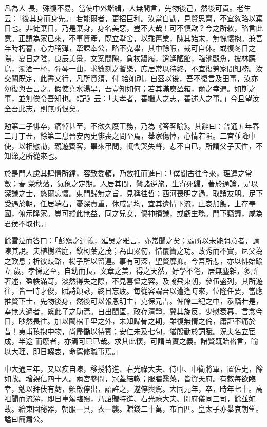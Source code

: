 \begin{pinyinscope}
 凡為人
 長，殊復不易，當使中外諧緝，人無間言，先物後己，然後可貴。老生云：「後其身而身先。」若能爾者，更招巨利。汝當自勖，見賢思齊，不宜忽略以棄日也。非徒棄日，乃是棄身，身名美惡，豈不大哉！可不慎歟？今之所敕，略言此意。正謂為家已來，不事資產，既立墅舍，以乖舊業，陳其始末，無愧懷抱。兼吾年時朽暮，心力稍殫，牽課奉公，略不克舉，其中餘暇，裁可自休。或復冬日之陽，夏日之陰，良辰美景，文案間隙，負杖躡履，逍遙陋館，臨池觀魚，披林聽鳥，濁酒一杯，彈琴一曲，求數刻之暫樂，庶居常以待終，不宜復勞家間細務。汝交關既定，此書又行，凡所資須，付
 給如別。自茲以後，吾不復言及田事，汝亦勿復與吾言之。假使堯水湯旱，吾豈知如何；若其滿庾盈箱，爾之幸遇。如斯之事，並無俟令吾知也。《記》云：「夫孝者，善繼人之志，善述人之事。」今且望汝全吾此志，則無所恨矣。



 勉第二子悱卒，痛悼甚至，不欲久廢王務，乃為《答客喻》。其辭曰：普通五年春二月丁丑，餘第二息晉安內史悱喪之問至焉，舉家傷悼，心情若隕。二宮並降中使，以相慰勖，親遊賓客，畢來弔問，輒慟哭失聲，悲不自已，所謂父子天性，不知涕之所從來也。



 於是門人慮其肆情所鐘，容致委頓，乃斂衽而進曰：「僕聞古往今來，理運之常數；春
 榮秋落，氣象之定期。人居其間，譬諸逆旅，生寄死歸，著於通論，是以深識之士，悠爾忘懷。東門歸無之旨，見稱往哲；西河喪明之過，取誚友朋。足下受遇於朝，任居端右，憂深責重，休戚是均，宜其遺情下流，止哀加飯，上存奉國，俯示隆家。豈可縱此無益，同之兒女，傷神損識，或虧生務。門下竊議，咸為君侯不取也。」



 餘雪泣而答曰：「彭殤之達義，延吳之雅言，亦常聞之矣；顧所以未能弭意者，請陳其說。夫植樹階庭，欽柯葉之茂；為山累仞，惜覆簣之功。故秀而不實，尼父為之歎息；析彼歧路，楊子所以留連。事有可深，聖賢靡抑。今吾所悲，亦以悱始踰立
 歲，孝悌之至，自幼而長，文章之美，得之天然，好學不倦，居無塵雜，多所著述，盈帙滿笥，淡然得失之際，不見喜慍之容。及翰飛東朝，參伍盛列，其所遊往，皆一時才俊，賦詩頌詠，終日忘疲。每從容謂吾以遭逢時來，位隆任要，當應推賢下士，先物後身，然後可以報恩明主，克保元吉。俾餘二紀之中，忝竊若是，幸無大過者，繄此子之助焉。自出閩區，政存清靜，冀其旋反，少慰衰暮，言念今日，眇然長往。加以闔棺千里之外，未知歸骨之期，雖復無情之倫，庸詎不痛於昔！夷甫孩抱中物，尚盡慟以待賓；安仁未及七旬，猶殷勤於詞賦。況夫名立宦成，半途
 而廢者，亦焉可已已哉。求其此懷，可謂苗實之義。諸賢既貽格言，喻以大理，即日輟哀，命駕修職事焉。」



 中大通三年，又以疾自陳，移授特進、右光祿大夫、侍中、中衛將軍，置佐史，餘如故。增親信四十人。兩宮參問，冠蓋結轍；服膳醫藥，皆資天府。有敕每欲臨幸，勉以拜伏有虧，頻啟停出，詔許之，遂停輿駕。大同元年，卒，時年七十。高祖聞而流涕，即日車駕臨殯，乃詔贈特進、右光祿大夫、開府儀同三司，餘並如故。給東園秘器，朝服一具，衣一襲。贈錢二十萬，布百匹。皇太子亦舉哀朝堂。謚曰簡肅公。




\end{pinyinscope}
